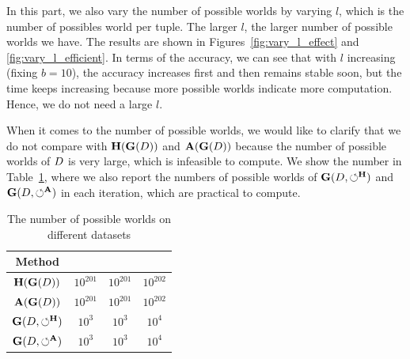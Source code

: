 


In this part, we also vary the number of possible worlds by varying $l$, which is the number of possibles world per tuple. The larger $l$, the larger number of possible worlds we have. The results are shown in Figures~\ref{fig:vary_l_effect} and  \ref{fig:vary_l_efficient}. In terms of the accuracy, we can see that with $l$ increasing (fixing $b=10$), the accuracy increases first and then  remains stable soon, but the time keeps increasing because more possible worlds indicate more computation. Hence, we do not need a large $l$.

When it comes to the number of possible worlds, we would like to clarify that we do not compare with $\mathbf{H}(\mathbf{G}(D))$ and $\mathbf{A}(\mathbf{G}(D))$ because  the number of  possible worlds of $D$ is very large, which is infeasible to compute. We show the number in Table~\ref{tbl:pwnum}, where we also report the numbers of possible worlds of $\mathbf{G}(D,\circlearrowleft^\mathbf{H})$ and $\mathbf{G}(D,\circlearrowleft^\mathbf{A})$ in each iteration, which are practical to compute.


\begin{table}
	\centering
	\caption{The number of possible worlds on different datasets}
	{\small
		\begin{tabular}{cccc}
			\hline
			{\bf Method} & {\bf \nursery} & {\bf \hr} & {\bf \adult} \\
			\hline	
			$\mathbf{H}(\mathbf{G}(D))$ & $10^{201}$ & $10^{201}$ & $10^{202}$ \\
			$\mathbf{A}(\mathbf{G}(D))$ & $10^{201}$ & $10^{201}$ & $10^{202}$ \\
			$\mathbf{G}(D,\circlearrowleft^\mathbf{H})$ & $10^3$ & $10^3$ & $10^4$ \\
			$\mathbf{G}(D,\circlearrowleft^\mathbf{A})$ & $10^3$ & $10^3$ & $10^4$ \\
			\hline
		\end{tabular}
	}
	\label{tbl:pwnum}
	\vspace{-1em}
\end{table}

